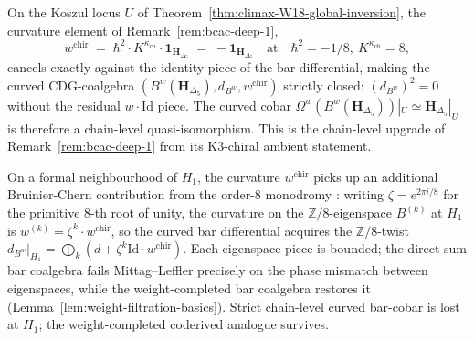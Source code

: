 \begin{remark}[Curved bar-cobar strict inversion on
$U = \overline{\mathcal{A}_2}\setminus(H_1\cup H_3\cup H_4)$]
\label{rem:bcac-1}
On the Koszul locus $U$ of
Theorem~\ref{thm:climax-W18-global-inversion}, the curvature
element of
Remark~\ref{rem:bcac-deep-1},
\[
 w^{\mathrm{chir}}
 \;=\; \hbar^2 \cdot K^{\kappa_{\mathrm{ch}}}
 \cdot \mathbf{1}_{\mathbf{H}_{\Delta_5}}
 \;=\; -\mathbf{1}_{\mathbf{H}_{\Delta_5}}
 \quad \text{at}\quad \hbar^2 = -1/8,\ K^{\kappa_{\mathrm{ch}}} = 8,
\]
cancels exactly against the identity piece of the bar
differential, making the curved CDG-coalgebra
$(B^w(\mathbf{H}_{\Delta_5}), d_{B^w}, w^{\mathrm{chir}})$
strictly closed: $(d_{B^w})^2 = 0$ without the residual
$w\cdot\mathrm{Id}$ piece. The curved cobar
$\Omega^w(B^w(\mathbf{H}_{\Delta_5}))|_U \simeq
\mathbf{H}_{\Delta_5}|_U$ is therefore a chain-level
quasi-isomorphism. This is the
chain-level upgrade of
Remark~\ref{rem:bcac-deep-1} from its K3-chiral ambient
statement.
\end{remark}

\begin{remark}
\label{rem:bcac-2}
On a formal neighbourhood of $H_1$, the curvature
$w^{\mathrm{chir}}$ picks up an additional Bruinier-Chern
contribution from the order-$8$ monodromy
\cite[Prop.~5.1]{Bruinier2002LNM}: writing
$\zeta = e^{2\pi i/8}$ for the primitive $8$-th root of unity, the
curvature on the $\mathbb{Z}/8$-eigenspace $B^{(k)}$ at $H_1$ is
$w^{(k)} = \zeta^k\cdot w^{\mathrm{chir}}$, so the curved bar
differential acquires the $\mathbb{Z}/8$-twist
$d_{B^w}|_{H_1} = \bigoplus_k (d + \zeta^k\mathrm{Id}\cdot
w^{\mathrm{chir}})$. Each eigenspace piece is bounded; the
direct-sum bar coalgebra fails Mittag--Leffler precisely on the
phase mismatch between eigenspaces, while the weight-completed bar
coalgebra restores it (Lemma~\ref{lem:weight-filtration-basics}).
Strict chain-level curved bar-cobar is lost at $H_1$; the
weight-completed coderived analogue survives.
\end{remark}

